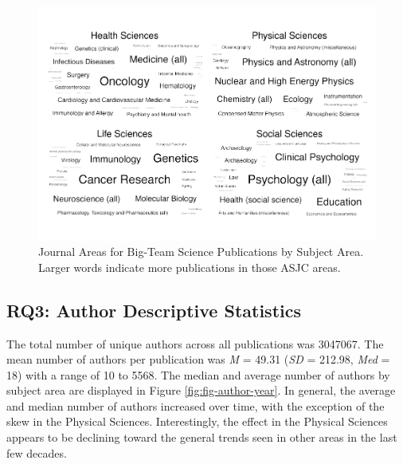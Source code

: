 \documentclass[
  man,floatsintext]{apa6}
\begin{document}
\begin{figure}
\centering
\includegraphics{manuscript_scopus_files/figure-latex/fig-clouds-1.pdf}
\caption{\label{fig:fig-clouds}Journal Areas for Big-Team Science Publications by Subject Area. Larger words indicate more publications in those ASJC areas.}
\end{figure}

\hypertarget{rq3-author-descriptive-statistics-1}{%
\subsection{RQ3: Author Descriptive Statistics}\label{rq3-author-descriptive-statistics-1}}

The total number of unique authors across all publications was
3047067. The mean number of authors per publication was \emph{M} =
49.31 (\emph{SD} = 212.98, \emph{Med} = 18) with a
range of 10 to 5568. The median and average
number of authors by subject area are displayed in Figure
\ref{fig:fig-author-year}. In general, the average and median number of
authors increased over time, with the exception of the skew in the
Physical Sciences. Interestingly, the effect in the Physical Sciences
appears to be declining toward the general trends seen in other areas in
the last few decades.
\end{document}
